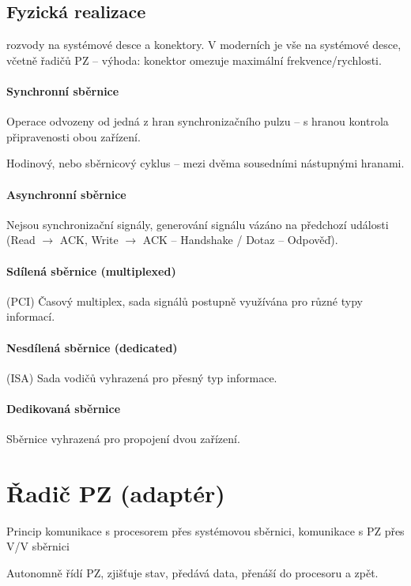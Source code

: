 \documentclass[a4paper, 11pt]{report}
\begin{document}
\subsection{Fyzická realizace} rozvody na systémové desce a konektory. V moderních je vše na systémové desce, včetně řadičů PZ -- výhoda: konektor omezuje maximální frekvence/rychlosti.

\paragraph{Synchronní sběrnice}
Operace odvozeny od jedná z hran synchronizačního pulzu -- s hranou kontrola připravenosti obou zařízení.

Hodinový, nebo sběrnicový cyklus -- mezi dvěma sousedními nástupnými hranami.

\paragraph{Asynchronní sběrnice}
Nejsou synchronizační signály, generování signálu vázáno na předchozí události (Read $\to$ ACK, Write $\to$ ACK -- Handshake / Dotaz -- Odpověď).

\paragraph{Sdílená sběrnice (multiplexed)} (PCI)
Časový multiplex, sada signálů postupně využívána pro různé typy informací.

\paragraph{Nesdílená sběrnice (dedicated)} (ISA)
Sada vodičů vyhrazená pro přesný typ informace.

\paragraph{Dedikovaná sběrnice}
Sběrnice vyhrazená pro propojení dvou zařízení.




\section{Řadič PZ (adaptér)}

Princip komunikace s procesorem přes systémovou sběrnici, komunikace s PZ přes V/V sběrnici

Autonomně řídí PZ, zjišťuje stav, předává data, přenáší do procesoru a zpět.
\end{document}
